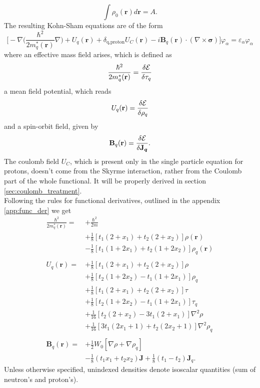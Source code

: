 \begin{equation}
    \label{eq:spe_ks_constraint}
    \int \rho_0(\bm r ) d\bm r = A.
\end{equation}
The resulting Kohn-Sham equations are of the form
\begin{equation}
    \label{eq:spe_ks}
    \bigg[-\nabla\bigg(\frac{\hbar^2}{2m^{*}_q(\mathbf r)}\nabla \bigg) + U_q(\mathbf r) + \delta_{\text{q,proton}}U_C(\mathbf r)-i\mathbf B_q(\mathbf r)\cdot(\nabla \times \boldsymbol\sigma) \bigg]\varphi_\alpha=\varepsilon_\alpha\varphi_\alpha
\end{equation}
where an effective mass field arises, which is defined as
\begin{equation}
    \frac{\hbar^2}{2m^{*}_q(\mathbf r)} = \fdv{\mathcal E}{\tau_q}
\end{equation}
a mean field potential, which reads
\begin{equation}
    U_q(\mathbf r) = \fdv{\mathcal E}{\rho_q}\label{eq:fdv_rho_skyrme}
\end{equation}
and a spin-orbit field, given by
\begin{equation}
    \mathbf B_q(\mathbf r) = \fdv{\mathcal E}{\boldsymbol{\mathbf J_q}}.
\end{equation}
The coulomb field $U_C$, which is present only in the single particle equation for protons, doesn't come from the Skyrme interaction, rather from the Coulomb part of the whole functional. It will be properly derived in section \ref{sec:coulomb_treatment}.
\\Following the rules for functional derivatives, outlined in the appendix \ref{app:func_der} we get
\begin{align}
    \frac{\hbar^2}{2m_q^*(\mathbf r)} =& +\frac{\hbar^2}{2m} \\&+ \frac 1 8 [t_1(2+x_1)+t_2(2+x_2)]\rho(\mathbf r) \\&- \frac 1 8 [t_1(1+2x_1)+t_2(1+2x_2)]\rho_q(\mathbf r ) \\\\
    U_q(\mathbf r) =& +\frac 1 8 [t_1(2+x_1)+t_2(2+x_2)]\rho \\&+ \frac 1 8 [t_2(1+2x_2)-t_1(1+2x_1)]\rho_q \\
    &+ \frac 1 8 [t_1(2+x_1)+t_2(2+x_2)]\tau \\&+ \frac 1 8 [t_2(1+2x_2)-t_1(1+2x_1)]\tau_q \\
    &+ \frac 1 {16} [t_2(2+x_2)-3t_1(2+x_1)] \nabla^2 \rho \\&+ \frac 1 {16} [3t_1(2x_1+1)+t_2(2x_2+1)] \nabla^2 \rho_q \\\\
    \mathbf B_q (\mathbf r ) = &+\frac 1 2 W_0 [\nabla\rho + \nabla \rho_q] \\&-\frac 1 8 (t_1 x_1 + t_2 x_2) \mathbf J + \frac 1 8 (t_1 - t_2) \mathbf J_q.
\end{align}
Unless otherwise specified, unindexed densities denote isoscalar quantities (sum of neutron's and proton's).